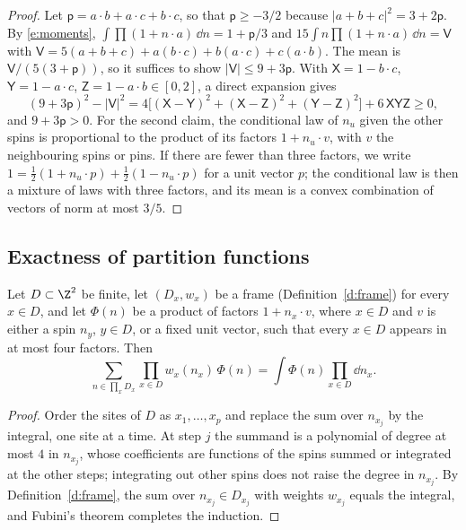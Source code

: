 \begin{proof}
Let $\mathsf p = a \cdot b + a \cdot c + b \cdot c$, so that $\mathsf p \ge -3/2$ because $|a + b + c|^2 = 3 + 2 \mathsf p$. By \eqref{e:moments}, $\int \prod (1 + n \cdot a) \, \dd n = 1 + \mathsf p/3$ and $15 \int n \prod (1 + n \cdot a) \, \dd n = \mathsf V$ with $\mathsf V = 5(a + b + c) + a (b \cdot c) + b (a \cdot c) + c (a \cdot b)$. The mean is $\mathsf V / (5 (3 + \mathsf p))$, so it suffices to show $|\mathsf V| \le 9 + 3 \mathsf p$. With $\mathsf X = 1 - b \cdot c$, $\mathsf Y = 1 - a \cdot c$, $\mathsf Z = 1 - a \cdot b \in [0, 2]$, a direct expansion gives
\begin{equation*}
(9 + 3 \mathsf p)^2 - |\mathsf V|^2 = 4 \bigl[ (\mathsf X - \mathsf Y)^2 + (\mathsf X - \mathsf Z)^2 + (\mathsf Y - \mathsf Z)^2 \bigr] + 6 \, \mathsf X \mathsf Y \mathsf Z \ge 0,
\end{equation*}
and $9 + 3 \mathsf p > 0$. For the second claim, the conditional law of $n_u$ given the other spins is proportional to the product of its factors $1 + n_u \cdot v$, with $v$ the neighbouring spins or pins. If there are fewer than three factors, we write $1 = \frac12 (1 + n_u \cdot p) + \frac12 (1 - n_u \cdot p)$ for a unit vector $p$; the conditional law is then a mixture of laws with three factors, and its mean is a convex combination of vectors of norm at most $3/5$.
\end{proof}

\subsection{Exactness of partition functions}\label{s:exact}

\begin{lemma}\label{l:exact}
Let $D \subset \Z^2$ be finite, let $(D_x, w_x)$ be a frame (Definition~\ref{d:frame}) for every $x \in D$, and let $\Phi(n)$ be a product of factors $1 + n_x \cdot v$, where $x \in D$ and $v$ is either a spin $n_y$, $y \in D$, or a fixed unit vector, such that every $x \in D$ appears in at most four factors. Then
\begin{equation*}
\sum_{n \in \prod_x D_x} \prod_{x \in D} w_x(n_x) \, \Phi(n) = \int \Phi(n) \prod_{x \in D} \dd n_x .
\end{equation*}
\end{lemma}

\begin{proof}
Order the sites of $D$ as $x_1, \dots, x_p$ and replace the sum over $n_{x_j}$ by the integral, one site at a time. At step $j$ the summand is a polynomial of degree at most $4$ in $n_{x_j}$, whose coefficients are functions of the spins summed or integrated at the other steps; integrating out other spins does not raise the degree in $n_{x_j}$. By Definition~\ref{d:frame}, the sum over $n_{x_j} \in D_{x_j}$ with weights $w_{x_j}$ equals the integral, and Fubini's theorem completes the induction.
\end{proof}

